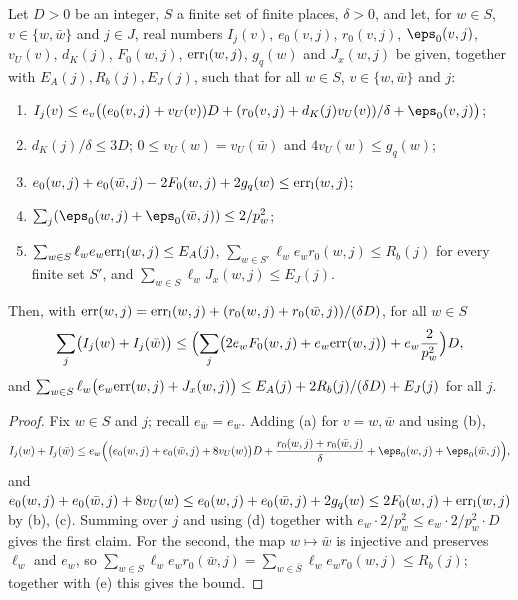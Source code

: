 \begin{lemma}\label{pf:onto3:globalform}
Let $D>0$ be an integer, $S$ a finite set of finite places, $\delta>0$, and let, for $w\in S$, $v\in\{w,\bar w\}$
and $j\in J$, real numbers $I_j(v)$, $e_0(v,j)$, $r_0(v,j)$, $\eps_0(v,j)$, $v_U(v)$, $d_K(j)$, $F_0(w,j)$,
$\mathrm{err}_{\mathrm{l}}(w,j)$, $g_q(w)$ and $J_x(w,j)$ be given, together with $E_A(j),R_b(j),E_J(j)$, such that for all
$w\in S$, $v\in\{w,\bar w\}$ and $j$:
\begin{enumerate}[label=(\alph*)]
\item $I_j(v)\le e_v\bigl((e_0(v,j)+v_U(v))D+(r_0(v,j)+d_K(j)v_U(v))/\delta+\eps_0(v,j)\bigr)$;
\item $d_K(j)/\delta\le3D$; $0\le v_U(w)=v_U(\bar w)$ and $4v_U(w)\le g_q(w)$;
\item $e_0(w,j)+e_0(\bar w,j)-2F_0(w,j)+2g_q(w)\le\mathrm{err}_{\mathrm{l}}(w,j)$;
\item $\sum_j(\eps_0(w,j)+\eps_0(\bar w,j))\le2/p_w^2$;
\item $\sum_{w\in S}\ell_we_w\mathrm{err}_{\mathrm{l}}(w,j)\le E_A(j)$, $\sum_{w\in S'}\ell_we_wr_0(w,j)\le R_b(j)$ for every
finite set $S'$, and $\sum_{w\in S}\ell_wJ_x(w,j)\le E_J(j)$.
\end{enumerate}
Then, with $\mathrm{err}(w,j)=\mathrm{err}_{\mathrm{l}}(w,j)+(r_0(w,j)+r_0(\bar w,j))/(\delta D)$, for all $w\in S$
\[
\sum_j\bigl(I_j(w)+I_j(\bar w)\bigr)\le\Bigl(\sum_j\bigl(2e_wF_0(w,j)+e_w\mathrm{err}(w,j)\bigr)+
e_w\frac{2}{p_w^2}\Bigr)D,
\]
and $\sum_{w\in S}\ell_w\bigl(e_w\mathrm{err}(w,j)+J_x(w,j)\bigr)\le E_A(j)+2R_b(j)/(\delta D)+E_J(j)$ for all $j$.
\end{lemma}

\begin{proof}
Fix $w\in S$ and $j$; recall $e_{\bar w}=e_w$. Adding (a) for $v=w,\bar w$ and using (b),
\[
I_j(w)+I_j(\bar w)\le e_w\Bigl(\bigl(e_0(w,j)+e_0(\bar w,j)+8v_U(w)\bigr)D+\frac{r_0(w,j)+r_0(\bar w,j)}{\delta}
+\eps_0(w,j)+\eps_0(\bar w,j)\Bigr),
\]
and $e_0(w,j)+e_0(\bar w,j)+8v_U(w)\le e_0(w,j)+e_0(\bar w,j)+2g_q(w)\le2F_0(w,j)+\mathrm{err}_{\mathrm{l}}(w,j)$ by (b), (c).
Summing over $j$ and using (d) together with $e_w\cdot2/p_w^2\le e_w\cdot2/p_w^2\cdot D$ gives the first claim. For
the second, the map $w\mapsto\bar w$ is injective and preserves $\ell_w$ and $e_w$, so
$\sum_{w\in S}\ell_we_wr_0(\bar w,j)=\sum_{w\in\bar S}\ell_we_wr_0(w,j)\le R_b(j)$; together with (e) this gives
the bound.
\end{proof}

